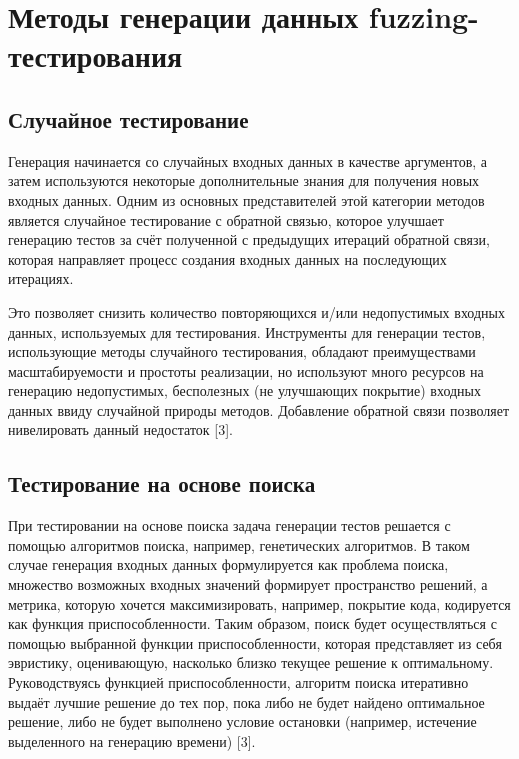 \section{Методы генерации данных fuzzing-тестирования} \label{ch2:sec-very-short-title} %
\subsection{Случайное тестирование}\label{ch2:random-test}
Генерация начинается со случайных входных
данных в качестве аргументов, а затем используются некоторые дополнительные знания для получения новых входных данных. Одним
из основных представителей этой категории методов является случайное тестирование с обратной связью, которое улучшает генерацию
тестов за счёт полученной с предыдущих итераций обратной связи, которая направляет процесс создания входных данных на последующих
итерациях. 

Это позволяет снизить количество повторяющихся и/или
недопустимых входных данных, используемых для тестирования.
Инструменты для генерации тестов, использующие методы случайного тестирования, обладают преимуществами масштабируемости и простоты реализации, но используют много ресурсов на генерацию недопустимых, бесполезных (не улучшающих покрытие) входных данных ввиду случайной природы методов. Добавление обратной
связи позволяет нивелировать данный недостаток [3].%


\subsection{Тестирование на основе поиска}\label{ch2:search-test}
При тестировании на основе поиска задача генерации тестов решается с
помощью алгоритмов поиска, например, генетических алгоритмов. В таком случае генерация входных данных формулируется как проблема поиска, множество возможных входных значений формирует пространство решений,
а метрика, которую хочется максимизировать, например, покрытие кода, кодируется как функция приспособленности. Таким образом, поиск
будет осуществляться с помощью выбранной функции приспособленности, которая представляет из себя эвристику, оценивающую, насколько
близко текущее решение к оптимальному. Руководствуясь функцией
приспособленности, алгоритм поиска итеративно выдаёт лучшие решение до тех пор, пока либо не будет найдено оптимальное решение, либо
не будет выполнено условие остановки (например, истечение выделенного на генерацию времени) [3].

